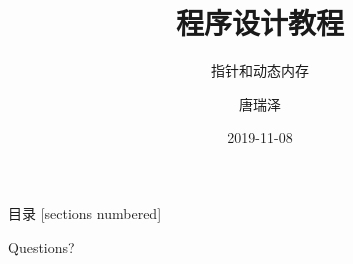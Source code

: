 \documentclass[10pt]{beamer}
\title{程序设计教程}
\subtitle{指针和动态内存}
\date{2019-11-08}
\author{唐瑞泽}
\institute{tangruize@smail.nju.edu.cn}
\begin{document}
	
\maketitle

\begin{frame}{目录}
	[sections numbered]
	\tableofcontents[hideallsubsections]
\end{frame}





\begin{frame}[standout]
	Questions?
\end{frame}
\end{document}
